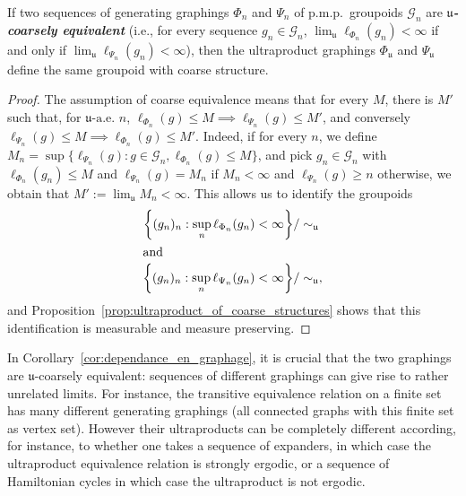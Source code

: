 \documentclass[AHL,Unicode,longabstracts,published]{cedram}
\newcommand{\defin}[1]{\textbf{\emph{#1}}}
\newcommand{\cg}{\mathcal{G}}
\newcommand{\ul}{\mathfrak{u}}
\newcommand{\ulae}{\mathfrak{u}\textrm{-a.e. }n}
\newcommand{\pmp}{p.m.p.\ }
\begin{document}
\begin{coro}\label{cor:dependance_en_graphage}
If two sequences of generating graphings $\Phi_n$ and $\Psi_n$ of \pmp groupoids $\cg_n$ are
\defin{$\ul$-coarsely equivalent} (i.e., for every sequence $g_n \in \cg_n$, $\lim_\ul \ell_{\Phi_n}(g_n) <\infty$ if and only if $\lim_\ul \ell_{\Psi_n}(g_n) <\infty$), then the ultraproduct graphings $\Phi_\ul$ and $\Psi_\ul$ define the same groupoid with coarse structure.
\end{coro}
\begin{proof}
The assumption of coarse equivalence means that for every $M$, there is $M'$ such that, for $\ulae$, $\ell_{\Phi_n}(g) \leq M \implies \ell_{\Psi_n}(g) \leq M'$, and conversely $\ell_{\Psi_n}(g) \leq M \implies \ell_{\Phi_n}(g) \leq M'$. Indeed, if for every $n$, we define $M_n = \sup\{ \ell_{\Psi_n}(g): g \in \cg_n, \ell_{\Phi_n}(g) \leq M\}$, and pick $g_n \in \cg_n$ with $\ell_{\Phi_n}(g_n) \leq M$ and $\ell_{\Psi_n}(g) = M_n$ if $M_n<\infty$ and $\ell_{\Psi_n}(g)\geq n$ otherwise, we obtain that $M':= \lim_\ul M_n <\infty$. This allows us to identify the groupoids
\pagebreak
\begin{align*}
\left\{ (g_n)_n : \sup_n \ell_{\Phi_n}(g_n) <\infty\right\} &/\sim_\ul
\\
\intertext{and}
\left\{ (g_n)_n : \sup_n \ell_{\Psi_n}(g_n) <\infty\right\} &/\sim_\ul,
\end{align*}
and Proposition~\ref{prop:ultraproduct_of_coarse_structures} shows that this identification is measurable and measure preserving.
\end{proof}

\begin{rema}
In Corollary~\ref{cor:dependance_en_graphage}, it is crucial that the two graphings are $\ul$-coarsely equivalent: sequences of different graphings can give rise to rather unrelated limits. For instance, the transitive equivalence relation on a finite set has many different generating graphings (all connected graphs with this finite set as vertex set). However their ultraproducts can be completely different according, for instance, to whether one takes a sequence of expanders, in which case the ultraproduct equivalence relation is strongly ergodic, or a sequence of Hamiltonian cycles in which case the ultraproduct is not ergodic.
\end{rema}
\end{document}
